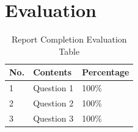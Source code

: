\newpage
\section{Evaluation}
\begin{table}[H]
\centering
\begin{tabular}{|l|l|l|}
\hline
\textbf{No.} & \textbf{Contents} & \textbf{Percentage} \\ \hline
1 & Question 1 & 100\% \\ \hline
2 & Question 2 & 100\% \\ \hline
3 & Question 3 & 100\% \\ \hline
\end{tabular}
\caption{Report Completion Evaluation Table}
\end{table}

